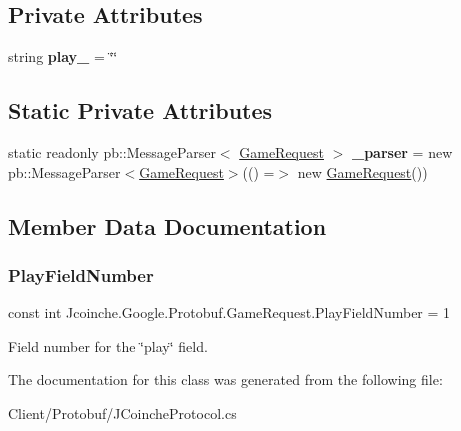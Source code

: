 \subsection*{Private Attributes}
\begin{DoxyCompactItemize}
\item 
\mbox{\label{class_jcoinche_1_1_google_1_1_protobuf_1_1_game_request_a97211c1d955754dc3974b70ae92a24fe}} 
string {\bfseries play\+\_\+} = \char`\"{}\char`\"{}
\end{DoxyCompactItemize}
\subsection*{Static Private Attributes}
\begin{DoxyCompactItemize}
\item 
\mbox{\label{class_jcoinche_1_1_google_1_1_protobuf_1_1_game_request_a8ba4922692baac4b0e6da1df90312e09}} 
static readonly pb\+::\+Message\+Parser$<$ \hyperlink{class_jcoinche_1_1_google_1_1_protobuf_1_1_game_request}{Game\+Request} $>$ {\bfseries \+\_\+parser} = new pb\+::\+Message\+Parser$<$\hyperlink{class_jcoinche_1_1_google_1_1_protobuf_1_1_game_request}{Game\+Request}$>$(() =$>$ new \hyperlink{class_jcoinche_1_1_google_1_1_protobuf_1_1_game_request}{Game\+Request}())
\end{DoxyCompactItemize}


\subsection{Member Data Documentation}
\mbox{\label{class_jcoinche_1_1_google_1_1_protobuf_1_1_game_request_a17f09b11e7126727cecc45c458ff09e3}} 
\subsubsection{\texorpdfstring{Play\+Field\+Number}{PlayFieldNumber}}
{\footnotesize\ttfamily const int Jcoinche.\+Google.\+Protobuf.\+Game\+Request.\+Play\+Field\+Number = 1}



Field number for the \char`\"{}play\char`\"{} field.



The documentation for this class was generated from the following file\+:\begin{DoxyCompactItemize}
\item 
Client/\+Protobuf/J\+Coinche\+Protocol.\+cs\end{DoxyCompactItemize}
